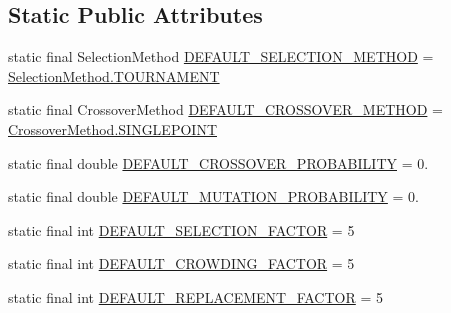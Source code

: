 \subsection*{Static Public Attributes}
\begin{DoxyCompactItemize}
\item 
static final Selection\-Method \hyperlink{classjenes_1_1stage_1_1operator_1_1common_1_1_multi_niche_crowder_3_01_t_01extends_01_chromosome_01_4_addd3f5fe352248ed9d5639e0d138f59d}{D\-E\-F\-A\-U\-L\-T\-\_\-\-S\-E\-L\-E\-C\-T\-I\-O\-N\-\_\-\-M\-E\-T\-H\-O\-D} = \hyperlink{enumjenes_1_1stage_1_1operator_1_1common_1_1_multi_niche_crowder_3_01_t_01extends_01_chromosome_01_4_1_1_selection_method_a3e49b3accf5c2ac32eabdf0b69951280}{Selection\-Method.\-T\-O\-U\-R\-N\-A\-M\-E\-N\-T}
\item 
static final Crossover\-Method \hyperlink{classjenes_1_1stage_1_1operator_1_1common_1_1_multi_niche_crowder_3_01_t_01extends_01_chromosome_01_4_aed986ca7d89144f78e73a11a5fb2f032}{D\-E\-F\-A\-U\-L\-T\-\_\-\-C\-R\-O\-S\-S\-O\-V\-E\-R\-\_\-\-M\-E\-T\-H\-O\-D} = \hyperlink{enumjenes_1_1stage_1_1operator_1_1common_1_1_multi_niche_crowder_3_01_t_01extends_01_chromosome_01_4_1_1_crossover_method_a49f5eb549967ad480c1071715dc9eaca}{Crossover\-Method.\-S\-I\-N\-G\-L\-E\-P\-O\-I\-N\-T}
\item 
static final double \hyperlink{classjenes_1_1stage_1_1operator_1_1common_1_1_multi_niche_crowder_3_01_t_01extends_01_chromosome_01_4_a6e6d3f4e8201a341f77ac92954dbdad4}{D\-E\-F\-A\-U\-L\-T\-\_\-\-C\-R\-O\-S\-S\-O\-V\-E\-R\-\_\-\-P\-R\-O\-B\-A\-B\-I\-L\-I\-T\-Y} = 0.
\item 
static final double \hyperlink{classjenes_1_1stage_1_1operator_1_1common_1_1_multi_niche_crowder_3_01_t_01extends_01_chromosome_01_4_aa3cfe11747630124e10809b0027d6f3a}{D\-E\-F\-A\-U\-L\-T\-\_\-\-M\-U\-T\-A\-T\-I\-O\-N\-\_\-\-P\-R\-O\-B\-A\-B\-I\-L\-I\-T\-Y} = 0.
\item 
static final int \hyperlink{classjenes_1_1stage_1_1operator_1_1common_1_1_multi_niche_crowder_3_01_t_01extends_01_chromosome_01_4_a937e501fc953576f30be99a0eec9ccf4}{D\-E\-F\-A\-U\-L\-T\-\_\-\-S\-E\-L\-E\-C\-T\-I\-O\-N\-\_\-\-F\-A\-C\-T\-O\-R} = 5
\item 
static final int \hyperlink{classjenes_1_1stage_1_1operator_1_1common_1_1_multi_niche_crowder_3_01_t_01extends_01_chromosome_01_4_ae7c682fcbb8e1de5270d79ca482bd93d}{D\-E\-F\-A\-U\-L\-T\-\_\-\-C\-R\-O\-W\-D\-I\-N\-G\-\_\-\-F\-A\-C\-T\-O\-R} = 5
\item 
static final int \hyperlink{classjenes_1_1stage_1_1operator_1_1common_1_1_multi_niche_crowder_3_01_t_01extends_01_chromosome_01_4_ac38d4afc42b5f54473834e76815c7510}{D\-E\-F\-A\-U\-L\-T\-\_\-\-R\-E\-P\-L\-A\-C\-E\-M\-E\-N\-T\-\_\-\-F\-A\-C\-T\-O\-R} = 5
\end{DoxyCompactItemize}

